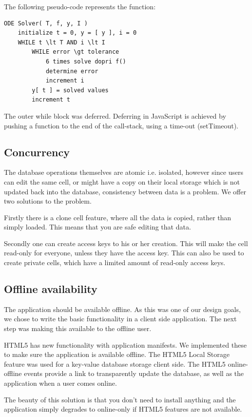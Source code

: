 \documentclass[10pt,a4paper]{report}
\begin{document}
			The following pseudo-code represents the function:
			
			\begin{lstlisting}
ODE Solver( T, f, y, I )
	initialize t = 0, y = [ y ], i = 0
	WHILE t \lt T AND i \lt I
		WHILE error \gt tolerance
			6 times solve dopri f()
			determine error
			increment i
		y[ t ] = solved values
		increment t
			\end{lstlisting}

			The outer while block was deferred. Deferring in JavaScript is achieved by pushing a function to the end of the call-stack, using a time-out (setTimeout).
			\clearpage
		
		\subsection{Concurrency}
			The database operations themselves are atomic i.e. isolated, however since users can edit the same cell, or might have a copy on their local storage which is not updated back into the database, consistency between data is a problem. We offer two solutions to the problem.
			
			Firstly there is a clone cell feature, where all the data is copied, rather than simply loaded. This means that you are safe editing that data.
			
			Secondly one can create access keys to his or her creation. This will make the cell read-only for everyone, unless they have the access key. This can also be used to create private cells, which have a limited amount of read-only access keys.
		
		\subsection{Offline availability}
			The application should be available offline. As this was one of our design goals, we chose to write the basic functionality in a client side application. The next step was making this available to the offline user.
			
			HTML5 has new functionality with application manifests. We implemented these to make sure the application is available offline. The HTML5 Local Storage feature was used for a key-value database storage client side. The HTML5 online-offline events provide a link to transparently update the database, as well as the application when a user comes online.
			
			The beauty of this solution is that you don't need to install anything and the application simply degrades to online-only if HTML5 features are not available.
		
\end{document}
